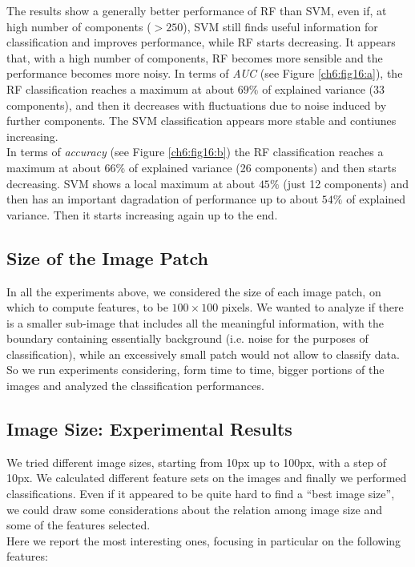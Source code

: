 The results show a generally better performance of \Gls{RF} than \Gls{SVM}, even if, at high number of components ($>250$), \Gls{SVM} still finds useful information
for classification and improves performance, while \Gls{RF} starts decreasing. It appears that, with a high number of components, \Gls{RF} becomes more sensible
and the performance becomes more noisy.
In terms of \textit{AUC} (see Figure \ref{ch6:fig16:a}), the \Gls{RF} classification reaches
a maximum at about $69\%$ of explained variance (33 components), and then it decreases with fluctuations due to noise induced by further components.
The \Gls{SVM} classification appears more stable and contiunes increasing.\\
In terms of \textit{accuracy} (see Figure \ref{ch6:fig16:b}) the \Gls{RF} classification reaches a maximum at about $66\%$ of explained variance (26 components)
and then starts decreasing. \Gls{SVM} shows a local maximum at about $45\%$ (just 12 components) and then has an important dagradation of performance up to 
about $54\%$ of explained variance. Then it starts increasing again up to the end.


\clearpage

\subsection{Size of the Image Patch}

In all the experiments above, we considered the size of each image patch, on which to compute features, to be $100\times100$ pixels.
We wanted to analyze if there is a smaller sub-image that includes all the meaningful information, with the boundary containing essentially background (i.e. noise for the
purposes of classification), while an excessively small patch would not allow to classify data.\\
So we run experiments considering, form time to time, bigger portions of the images and analyzed the classification performances.




\vspace{0.5cm}

\subsection{Image Size: Experimental Results}

We tried different image sizes, starting from 10px up to 100px, with a step of 10px. We calculated different feature sets on the images and finally we performed classifications.
Even if it appeared to be quite hard to find a \textquotedblleft{}best image size\textquotedblright, we could draw some considerations about the relation among image size and
some of the features selected.\\
Here we report the most interesting ones, focusing in particular on the following features:

